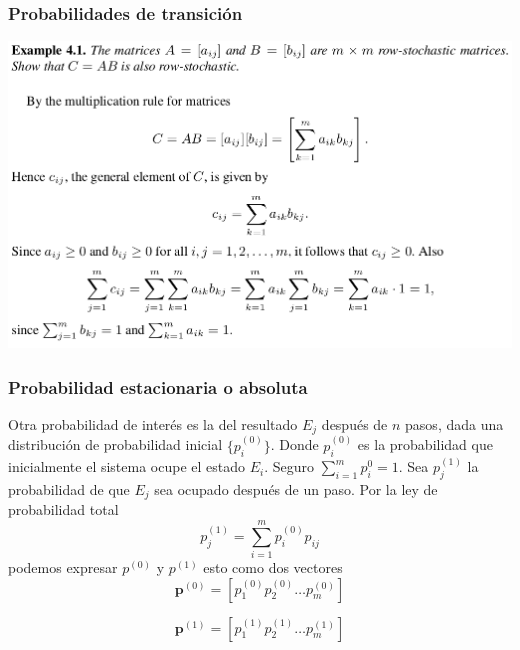 \documentclass[spanish]{beamer}
\begin{document}
\begin{frame}
\frametitle{Probabilidades de transición}
\begin{center}
\includegraphics[scale=0.3]{im1}
\end{center}

\end{frame}
\begin{frame}
\frametitle{Probabilidad estacionaria o absoluta}
Otra probabilidad de interés es la del resultado $E_{j}$ después de $n$ pasos, dada una distribución de probabilidad inicial $\lbrace p_{i}^{(0)}\rbrace$.  Donde $p_{i}^{(0)}$ es la probabilidad que inicialmente el sistema ocupe el estado $E_{i}$. Seguro $\sum_{i=1}^{m}p_{i}^{0}=1$. Sea $p_{j}^{(1)}$  la probabilidad de que $E_{j}$ sea ocupado después de un paso. Por la ley de probabilidad total 
\begin{equation*}
p_{j}^{(1)}= \sum_{i=1}^{m}p_{i}^{(0)} p_{ij}
\end{equation*}
podemos expresar $p^{(0)}$ y $p^{(1)}$ esto como dos vectores 
\begin{equation*}
\textbf{p}^{(0)}= \left[ p_{1}^{(0)} p_{2}^{(0)}  \ldots p_{m}^{(0)} \right]  
\end{equation*}

\begin{equation*}
\textbf{p}^{(1)}= \left[ p_{1}^{(1)} p_{2}^{(1)}  \ldots p_{m}^{(1)} \right]  
\end{equation*}


\end{frame}
\end{document}
